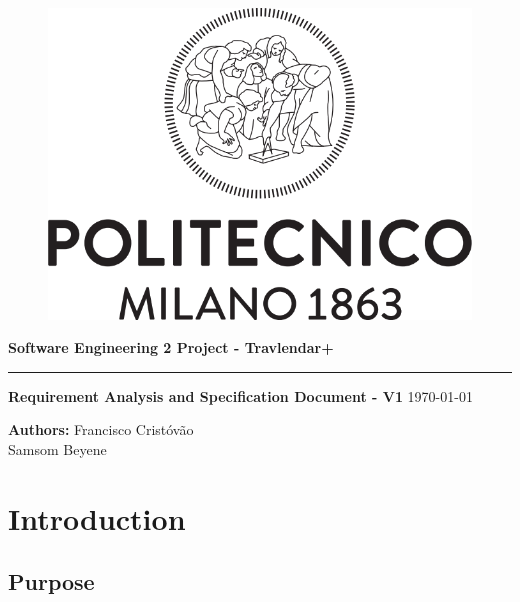 \documentclass[12pt]{article}
\begin{document}
\begin{titlepage}
    \begin{center}
    \begin{figure}
        \centering
        \includegraphics[scale=0.2]{logoPolimi.png}
        \vspace{1.5cm}
    \end{figure}

    \Huge\textbf{Software Engineering 2 Project - Travlendar+}
    \rule{12cm}{0.5pt}
    \Huge\textbf{Requirement Analysis and Specification Document - V1}
    \today
    \end{center}
    
    \vspace{3cm}
    
    \begin{flushleft}
        \LARGE\textbf{Authors: }
        \newline\newline
        \Large\texttt{}{Francisco Cristóvão \\ Samsom Beyene}
    \end{flushleft}



\end{titlepage}

\newpage
  \tableofcontents
\newpage

\section{Introduction}

\subsection{Purpose}
\end{document}
